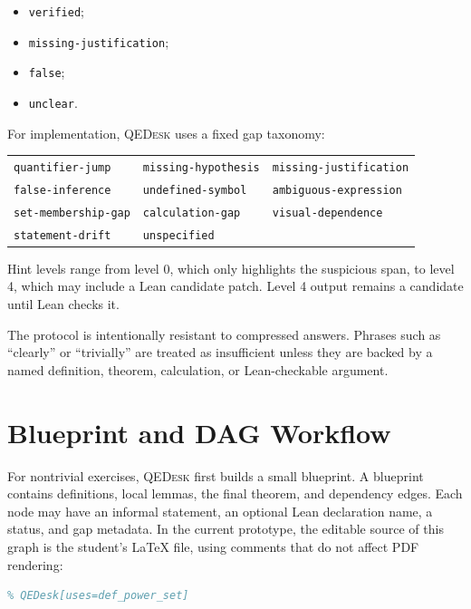 \documentclass[11pt]{article}
\newcommand{\qedesk}{\textsc{QEDesk}}
\begin{document}
\begin{itemize}[leftmargin=2em]
  \item \texttt{verified};
  \item \texttt{missing-justification};
  \item \texttt{false};
  \item \texttt{unclear}.
\end{itemize}

For implementation, \qedesk{} uses a fixed gap taxonomy:

\begin{center}
\small
\begin{tabular}{lll}
\texttt{quantifier-jump} & \texttt{missing-hypothesis} & \texttt{missing-justification} \\
\texttt{false-inference} & \texttt{undefined-symbol} & \texttt{ambiguous-expression} \\
\texttt{set-membership-gap} & \texttt{calculation-gap} & \texttt{visual-dependence} \\
\texttt{statement-drift} & \texttt{unspecified} & \\
\end{tabular}
\end{center}

Hint levels range from level 0, which only highlights the suspicious span, to
level 4, which may include a Lean candidate patch.  Level 4 output remains a
candidate until Lean checks it.

The protocol is intentionally resistant to compressed answers.  Phrases such
as ``clearly'' or ``trivially'' are treated as insufficient unless they are
backed by a named definition, theorem, calculation, or Lean-checkable argument.

\section{Blueprint and DAG Workflow}

For nontrivial exercises, \qedesk{} first builds a small blueprint.  A blueprint
contains definitions, local lemmas, the final theorem, and dependency edges.
Each node may have an informal statement, an optional Lean declaration name,
a status, and gap metadata.  In the current prototype, the editable source of
this graph is the student's LaTeX file, using comments that do not affect PDF
rendering:

\begin{lstlisting}[language=TeX]
% QEDesk[node=mem_power_set][kind=lemma]
% QEDesk[uses=def_power_set]
\end{lstlisting}
\end{document}

